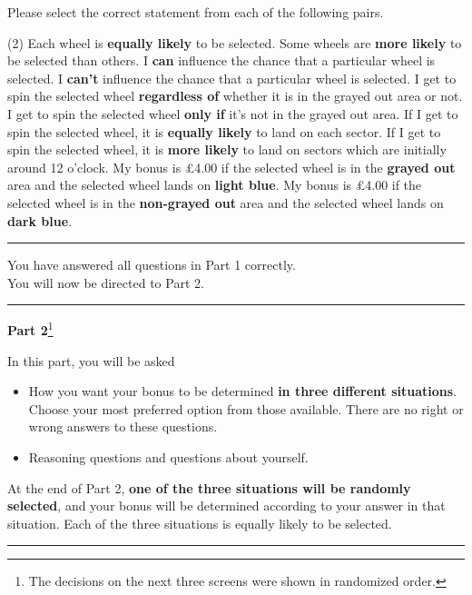 \documentclass[pdftex,12pt, a4paper]{article}
\begin{document}
\noindent Please select the correct statement from each of the following pairs.

\begin{tasks}[style=itemize](2)
\task Each wheel is \textbf{equally likely} to be selected.
\task Some wheels are \textbf{more likely} to be selected than others.
\task I \textbf{can} influence the chance that a particular wheel is selected.
\task I \textbf{can't} influence the chance that a particular wheel is selected. 
\task I get to spin the selected wheel \textbf{regardless of} whether it is in the grayed out area or not.
\task I get to spin the selected wheel \textbf{only if} it's not in the grayed out area.
\task If I get to spin the selected wheel, it is \textbf{equally likely} to land on each sector.
\task If I get to spin the selected wheel, it is \textbf{more likely} to land on sectors which are initially around 12 o'clock. 
\task My bonus is £4.00 if the selected wheel is in the \textbf{grayed out} area and the selected wheel lands on \textbf{light blue}.
\task My bonus is £4.00 if the selected wheel is in the \textbf{non-grayed out} area and the selected wheel lands on \textbf{dark blue}.
\end{tasks}

\bigskip
\noindent \rule{\linewidth}{0.4pt}

\noindent You have answered all questions in Part 1 correctly. \\
You will now be directed to Part 2.

\bigskip
\noindent \rule{\linewidth}{0.4pt}

\noindent \textbf{Part 2}\footnote{
The decisions on the next three screens were shown in randomized order.
}

\noindent In this part, you will be asked 
\begin{itemize}
\item How you want your bonus to be determined \textbf{in three different situations}.
Choose your most preferred option from those available.
There are no right or wrong answers to these questions.
\item Reasoning questions and questions about yourself.
\end{itemize}

\noindent At the end of Part 2, \textbf{one of the three situations will be randomly selected}, and your bonus will be determined according to your answer in that situation.
Each of the three situations is equally likely to be selected.

\noindent \rule{\linewidth}{0.4pt}
\end{document}
